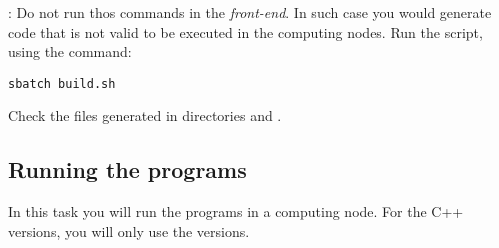 : 
Do not run thos commands in the \emph{front-end}.
In such case you would generate code that is not valid to be executed
in the computing nodes.
Run the script, using the command:

\begin{lstlisting}[style=terminal]
sbatch build.sh
\end{lstlisting}

Check the files generated in directories
and .

\subsection{Running the programs}

In this task you will run the programs in a computing node.
For the C++ versions, you will only use the  versions.

